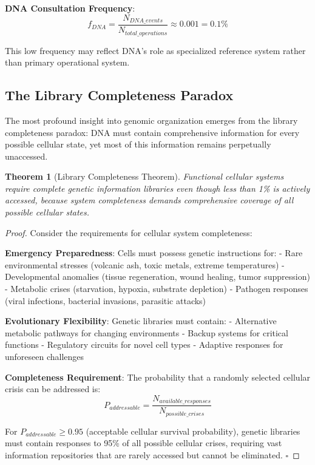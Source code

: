 \documentclass[12pt,a4paper]{article}
\newtheorem{theorem}{Theorem}[section]
\begin{document}
\textbf{DNA Consultation Frequency}:
$$f_{DNA} = \frac{N_{DNA\_events}}{N_{total\_operations}} \approx 0.001 = 0.1\%$$

This low frequency may reflect DNA's role as specialized reference system rather than primary operational system.

\subsection{The Library Completeness Paradox}

The most profound insight into genomic organization emerges from the library completeness paradox: DNA must contain comprehensive information for every possible cellular state, yet most of this information remains perpetually unaccessed.

\begin{theorem}[Library Completeness Theorem]
Functional cellular systems require complete genetic information libraries even though less than 1\% is actively accessed, because system completeness demands comprehensive coverage of all possible cellular states.
\end{theorem}

\begin{proof}
Consider the requirements for cellular system completeness:

\textbf{Emergency Preparedness}: Cells must possess genetic instructions for:
- Rare environmental stresses (volcanic ash, toxic metals, extreme temperatures)
- Developmental anomalies (tissue regeneration, wound healing, tumor suppression)
- Metabolic crises (starvation, hypoxia, substrate depletion)
- Pathogen responses (viral infections, bacterial invasions, parasitic attacks)

\textbf{Evolutionary Flexibility}: Genetic libraries must contain:
- Alternative metabolic pathways for changing environments
- Backup systems for critical functions
- Regulatory circuits for novel cell types
- Adaptive responses for unforeseen challenges

\textbf{Completeness Requirement}: The probability that a randomly selected cellular crisis can be addressed is:
$$P_{addressable} = \frac{N_{available\_responses}}{N_{possible\_crises}}$$

For $P_{addressable} \geq 0.95$ (acceptable cellular survival probability), genetic libraries must contain responses to 95\% of all possible cellular crises, requiring vast information repositories that are rarely accessed but cannot be eliminated. $\square$
\end{proof}
\end{document}

